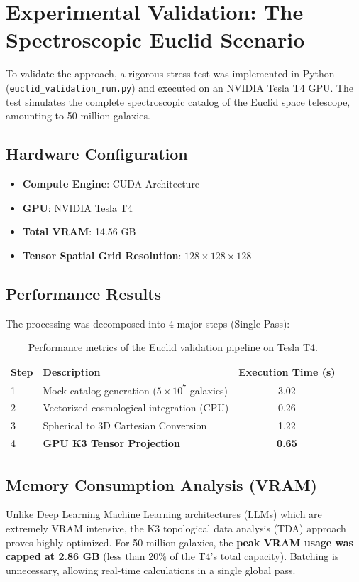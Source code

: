 \documentclass[11pt,a4paper]{article}
\begin{document}
\section{Experimental Validation: The Spectroscopic Euclid Scenario}

To validate the approach, a rigorous stress test was implemented in Python (\texttt{euclid\_validation\_run.py}) and executed on an NVIDIA Tesla T4 GPU. The test simulates the complete spectroscopic catalog of the Euclid space telescope, amounting to 50 million galaxies.

\subsection{Hardware Configuration}
\begin{itemize}
    \item \textbf{Compute Engine}: CUDA Architecture
    \item \textbf{GPU}: NVIDIA Tesla T4
    \item \textbf{Total VRAM}: 14.56 GB
    \item \textbf{Tensor Spatial Grid Resolution}: $128 \times 128 \times 128$
\end{itemize}

\subsection{Performance Results}
The processing was decomposed into 4 major steps (Single-Pass):
\begin{table}[h]
    \centering
    \begin{tabular}{@{}llc@{}}
    \toprule
    \textbf{Step} & \textbf{Description} & \textbf{Execution Time (s)} \\ \midrule
    1 & Mock catalog generation ($5 \times 10^7$ galaxies) & 3.02 \\
    2 & Vectorized cosmological integration (CPU) & 0.26 \\
    3 & Spherical to 3D Cartesian Conversion & 1.22 \\
    4 & \textbf{GPU K3 Tensor Projection} & \textbf{0.65} \\ \bottomrule
    \end{tabular}
    \caption{Performance metrics of the Euclid validation pipeline on Tesla T4.}
\end{table}

\subsection{Memory Consumption Analysis (VRAM)}
Unlike Deep Learning Machine Learning architectures (LLMs) which are extremely VRAM intensive, the K3 topological data analysis (TDA) approach proves highly optimized. For 50 million galaxies, the \textbf{peak VRAM usage was capped at 2.86 GB} (less than 20\% of the T4's total capacity). Batching is unnecessary, allowing real-time calculations in a single global pass.
\end{document}
